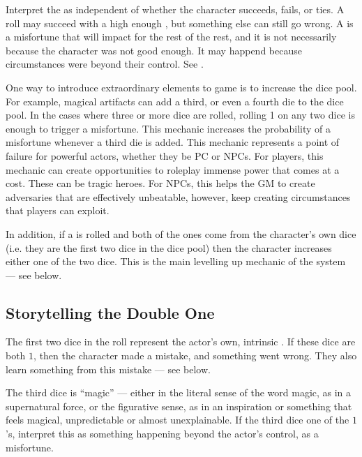 Interpret the  as independent of whether the character
succeeds, fails, or ties. A roll may succeed with a high enough ,
but something else can still go wrong. A  is a misfortune that will
impact for the rest of the rest, and it is not necessarily
because the character was not good enough. It may happend because circumstances were
beyond their control. See .

One way to introduce extraordinary elements to game is to increase the dice pool.
For example, magical artifacts can add a third, or even a fourth die to the dice pool.
In the cases where three or more dice are rolled,
rolling 1 on any two dice is enough to trigger a misfortune.
This mechanic increases the probability of a misfortune
whenever a third die is added. This mechanic represents
a point of failure for powerful actors, whether they be
PC or NPCs. For players, this mechanic can create
opportunities to roleplay immense power that comes at a cost.
These can be tragic heroes. For NPCs, this helps the GM
to create adversaries that are effectively unbeatable,
however, keep creating circumstances that players can exploit.

In addition, if a  is rolled and both of the ones
come from the character's own dice (i.e. they are the first
two dice in the dice pool) then the character increases either
one of the two dice. This is the main levelling up mechanic of
the system --- see  below.

\subsection{Storytelling the Double One}
\label{subsec:storytelling_the_double_one}

The first two dice in the roll represent the actor's own, intrinsic .
If these dice are both $1$, then the character made a mistake, and something went wrong.
They also learn something from this mistake --- see  below.

The third dice is ``magic'' --- either in the literal sense of the word magic, as in a supernatural force,
or the figurative sense, as in an inspiration or something that feels magical, unpredictable or almost unexplainable.
If the third dice one of the $1$'s, interpret this as something happening beyond the actor's control, as a misfortune.

